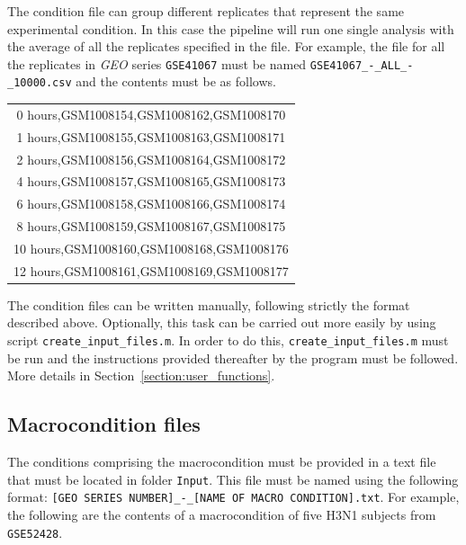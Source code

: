 \documentclass[final,letterpaper,twoside,12pt]{article}
\begin{document}
\par The condition file can group different replicates that represent the same experimental condition. In this case the pipeline will run one single analysis with the average of all the replicates specified in the file. For example, the file for all the replicates in \textit{GEO} series \texttt{GSE41067} must be named \texttt{GSE41067\_-\_ALL\_-\_10000.csv} and the contents must be as follows.

\begin{center}
\begin{tabular}{ c }

0 hours,GSM1008154,GSM1008162,GSM1008170 \\
1 hours,GSM1008155,GSM1008163,GSM1008171 \\
2 hours,GSM1008156,GSM1008164,GSM1008172 \\
4 hours,GSM1008157,GSM1008165,GSM1008173 \\
6 hours,GSM1008158,GSM1008166,GSM1008174 \\
8 hours,GSM1008159,GSM1008167,GSM1008175 \\
10 hours,GSM1008160,GSM1008168,GSM1008176 \\
12 hours,GSM1008161,GSM1008169,GSM1008177 \\


\end{tabular}
\end{center}

\par The condition files can be written manually, following strictly the format described above. Optionally, this task can be carried out more easily by using script \texttt{create\_input\_files.m}. In order to do this, \texttt{create\_input\_files.m} must be run and the instructions provided thereafter by the program must be followed. More details in Section~\ref{section:user_functions}.

\subsection{Macrocondition files}

\par The conditions comprising the macrocondition must be provided in a text file that must be located in folder \texttt{Input}. This file must be named using the following format: \texttt{[GEO SERIES NUMBER]\_-\_[NAME OF MACRO CONDITION].txt}. For example, the following are the contents of a macrocondition of five H3N1 subjects from \texttt{GSE52428}.
\end{document}
